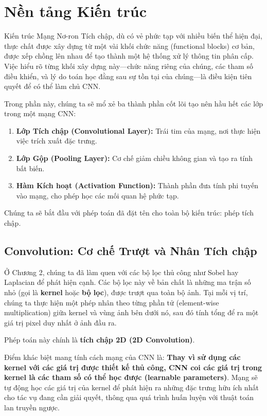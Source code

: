 \section{Nền tảng Kiến trúc}
\label{sec:cnn_architecture_fundamentals}

Kiến trúc Mạng Nơ-ron Tích chập, dù có vẻ phức tạp với nhiều biến thể hiện đại, thực chất được xây dựng từ một vài khối chức năng (functional blocks) cơ bản, được xếp chồng lên nhau để tạo thành một hệ thống xử lý thông tin phân cấp. Việc hiểu rõ từng khối xây dựng này—chức năng riêng của chúng, các tham số điều khiển, và lý do toán học đằng sau sự tồn tại của chúng—là điều kiện tiên quyết để có thể làm chủ CNN.

Trong phần này, chúng ta sẽ mổ xẻ ba thành phần cốt lõi tạo nên hầu hết các lớp trong một mạng CNN:
\begin{enumerate}
	\item \textbf{Lớp Tích chập (Convolutional Layer):} Trái tim của mạng, nơi thực hiện việc trích xuất đặc trưng.
	\item \textbf{Lớp Gộp (Pooling Layer):} Cơ chế giảm chiều không gian và tạo ra tính bất biến.
	\item \textbf{Hàm Kích hoạt (Activation Function):} Thành phần đưa tính phi tuyến vào mạng, cho phép học các mối quan hệ phức tạp.
\end{enumerate}

Chúng ta sẽ bắt đầu với phép toán đã đặt tên cho toàn bộ kiến trúc: phép tích chập.

\subsection{Convolution: Cơ chế Trượt và Nhân Tích chập}
\label{subsec:convolution_mechanism}

Ở Chương 2, chúng ta đã làm quen với các bộ lọc thủ công như Sobel hay Laplacian để phát hiện cạnh. Các bộ lọc này về bản chất là những ma trận số nhỏ (gọi là \textbf{kernel} hoặc \textbf{bộ lọc}), được trượt qua toàn bộ ảnh. Tại mỗi vị trí, chúng ta thực hiện một phép nhân theo từng phần tử (element-wise multiplication) giữa kernel và vùng ảnh bên dưới nó, sau đó tính tổng để ra một giá trị pixel duy nhất ở ảnh đầu ra.

Phép toán này chính là \textbf{tích chập 2D (2D Convolution)}.

Điểm khác biệt mang tính cách mạng của CNN là: \textbf{Thay vì sử dụng các kernel với các giá trị được thiết kế thủ công, CNN coi các giá trị trong kernel là các tham số có thể học được (learnable parameters)}. Mạng sẽ tự động học các giá trị của kernel để phát hiện ra những đặc trưng hữu ích nhất cho tác vụ đang cần giải quyết, thông qua quá trình huấn luyện với thuật toán lan truyền ngược.

